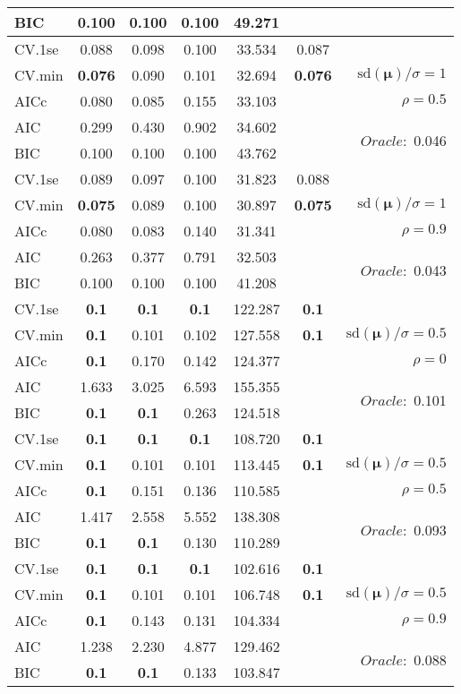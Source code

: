 \begin{table}
\begin{center}
\begin{tabular}{l*{5}{c}|r}
BIC & 0.100 & 0.100 & 0.100 & 49.271 & &  \\
 \hline 
CV.1se & 0.088 & 0.098 & 0.100 & 33.534 & 0.087 & \\
CV.min & {\bf 0.076} & 0.090 & 0.101 & 32.694 & {\bf 0.076} &  $\mathrm{sd}(\mathbf{\mu})/\sigma=1$ \\
AICc & 0.080 & 0.085 & 0.155 & 33.103 & & $\rho=0.5$ \\
AIC & 0.299 & 0.430 & 0.902 & 34.602 & &  \multirow{2}{*}{$Oracle: $ 0.046} \\
BIC & 0.100 & 0.100 & 0.100 & 43.762 & &  \\
 \hline 
CV.1se & 0.089 & 0.097 & 0.100 & 31.823 & 0.088 & \\
CV.min & {\bf 0.075} & 0.089 & 0.100 & 30.897 & {\bf 0.075} &  $\mathrm{sd}(\mathbf{\mu})/\sigma=1$ \\
AICc & 0.080 & 0.083 & 0.140 & 31.341 & & $\rho=0.9$ \\
AIC & 0.263 & 0.377 & 0.791 & 32.503 & &  \multirow{2}{*}{$Oracle: $ 0.043} \\
BIC & 0.100 & 0.100 & 0.100 & 41.208 & &  \\
 \hline 
CV.1se & {\bf 0.1} & {\bf 0.1} & {\bf 0.1} & 122.287 & {\bf 0.1} & \\
CV.min & {\bf 0.1} & 0.101 & 0.102 & 127.558 & {\bf 0.1} &  $\mathrm{sd}(\mathbf{\mu})/\sigma=0.5$ \\
AICc & {\bf 0.1} & 0.170 & 0.142 & 124.377 & & $\rho=0$ \\
AIC & 1.633 & 3.025 & 6.593 & 155.355 & &  \multirow{2}{*}{$Oracle: $ 0.101} \\
BIC & {\bf 0.1} & {\bf 0.1} & 0.263 & 124.518 & &  \\
 \hline 
CV.1se & {\bf 0.1} & {\bf 0.1} & {\bf 0.1} & 108.720 & {\bf 0.1} & \\
CV.min & {\bf 0.1} & 0.101 & 0.101 & 113.445 & {\bf 0.1} &  $\mathrm{sd}(\mathbf{\mu})/\sigma=0.5$ \\
AICc & {\bf 0.1} & 0.151 & 0.136 & 110.585 & & $\rho=0.5$ \\
AIC & 1.417 & 2.558 & 5.552 & 138.308 & &  \multirow{2}{*}{$Oracle: $ 0.093} \\
BIC & {\bf 0.1} & {\bf 0.1} & 0.130 & 110.289 & &  \\
 \hline 
CV.1se & {\bf 0.1} & {\bf 0.1} & {\bf 0.1} & 102.616 & {\bf 0.1} & \\
CV.min & {\bf 0.1} & 0.101 & 0.101 & 106.748 & {\bf 0.1} &  $\mathrm{sd}(\mathbf{\mu})/\sigma=0.5$ \\
AICc & {\bf 0.1} & 0.143 & 0.131 & 104.334 & & $\rho=0.9$ \\
AIC & 1.238 & 2.230 & 4.877 & 129.462 & &  \multirow{2}{*}{$Oracle: $ 0.088} \\
BIC & {\bf 0.1} & {\bf 0.1} & 0.133 & 103.847 & &  \\
 \hline 
\end{tabular}
\end{center}
\vspace{-1cm}
\end{table}




